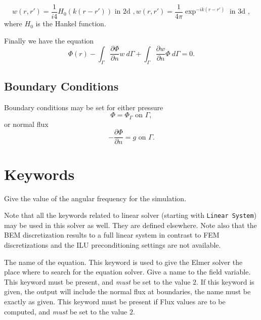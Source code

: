 \begin{equation}
 w(r,r') = \frac{1}{i4}H_0(k(r-r')) \mbox{ in 2d }, 
 w(r,r') = \frac{1}{4\pi}\exp^{-ik(r-r')} \mbox{ in 3d },
\end{equation}
where $H_0$ is the Hankel function.

Finally we have the equation
\begin{equation}
\Phi(r) -
\int_\Gamma \frac{\partial\Phi}{\partial n} w\ d\Gamma +
\int_\Gamma \frac{\partial w}{\partial n} \Phi\ d\Gamma = 0.
\end{equation}

\subsection{Boundary Conditions}

Boundary conditions may be set for either pressure
\begin{equation}
\Phi = \Phi_\Gamma \mbox{ on } \Gamma,
\end{equation}
or normal flux
\begin{equation}
-\frac{\partial \Phi}{\partial n} = g \mbox{ on } \Gamma.
\end{equation}


\section{Keywords} 

\sifbegin

\sifbegin
{}
Give the value of the angular frequency for the simulation.
\sifend

Note that all the keywords related to linear solver (starting with {\tt Linear System})
may be used in this solver as well.
They are defined elsewhere.  Note also that the BEM discretization
results to a full linear system in contrast to FEM discretizations
and the ILU preconditioning settings are not available.

\sifbegin
{} 
The name of the equation.
This keyword is used to give the Elmer solver the place where
to search for the  equation solver.
Give a name to the field variable.
This keyword must be present, and {\it must} be set to the value $2$.
If this keyword is given, the output will include the normal flux at
boundaries, the name must be exactly as given.
This keyword must be present if Flux values are to be computed,
and {\it must} be set to the value $2$.
\sifend


